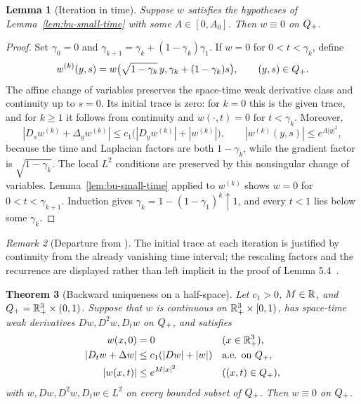 \documentclass[11pt,letterpaper]{article}
\numberwithin{equation}{section}
\theoremstyle{plain}
\newtheorem{theorem}{Theorem}[section]
\newtheorem{lemma}[theorem]{Lemma}
\theoremstyle{definition}
\theoremstyle{remark}
\newtheorem{remark}[theorem]{Remark}
\begin{document}
\begin{lemma}[Iteration in time]\label{lem:bu-iterate}
Suppose $w$ satisfies the hypotheses of Lemma~\ref{lem:bu-small-time} with
some $A\in[0,A_0]$. Then $w\equiv0$ on $Q_+$.
\end{lemma}

\begin{proof}
Set $\gamma_0=0$ and
$\gamma_{k+1}=\gamma_k+(1-\gamma_k)\gamma_1$. If $w=0$ for
$0<t<\gamma_k$, define
\[
 w^{(k)}(y,s)=w\big(\sqrt{1-\gamma_k}\,y,
                   \gamma_k+(1-\gamma_k)s\big),
 \qquad (y,s)\in Q_+.
\]
The affine change of variables preserves the space-time weak derivative
class and continuity up to $s=0$. Its initial trace is zero: for $k=0$ this
is the given trace, and for $k\ge1$ it follows from continuity and
$w(\cdot,t)=0$ for $t<\gamma_k$. Moreover,
\[
 |D_sw^{(k)}+\Delta_yw^{(k)}|
 \le c_1\big(|D_yw^{(k)}|+|w^{(k)}|\big),\qquad
 |w^{(k)}(y,s)|\le e^{A|y|^2},
\]
because the time and Laplacian factors are both $1-\gamma_k$, while the
gradient factor is $\sqrt{1-\gamma_k}$. The local $L^2$ conditions are
preserved by this nonsingular change of variables. Lemma~\ref{lem:bu-small-time}
applied to $w^{(k)}$ shows $w=0$ for $0<t<\gamma_{k+1}$. Induction gives
$\gamma_k=1-(1-\gamma_1)^k\uparrow1$, and every $t<1$ lies below some
$\gamma_k$.
\end{proof}

\begin{remark}[Departure from \cite{ESS2003}]
The initial trace at each iteration is justified by continuity from the
already vanishing time interval; the rescaling factors and the recurrence
are displayed rather than left implicit in the proof of Lemma 5.4~\cite[§5, p.~238]{ESS2003}.
\end{remark}

\begin{theorem}[Backward uniqueness on a half-space]\label{thm:bu}
Let $c_1>0$, $M\in\mathbb{R}$, and $Q_+=\mathbb{R}^3_+\times(0,1)$. Suppose that $w$ is
continuous on $\mathbb{R}^3_+\times[0,1)$, has space-time weak derivatives
$Dw,D^2w,D_tw$ on $Q_+$, and satisfies
\begin{align*}
 w(x,0)&=0 &&(x\in\mathbb{R}^3_+),\\
 |D_tw+\Delta w|&\le c_1(|Dw|+|w|) &&\text{a.e. on }Q_+,\\
 |w(x,t)|&\le e^{M|x|^2} &&((x,t)\in Q_+),
\end{align*}
with $w,Dw,D^2w,D_tw\in L^2$ on every bounded subset of $Q_+$. Then
$w\equiv0$ on $Q_+$.
\end{theorem}
\end{document}
